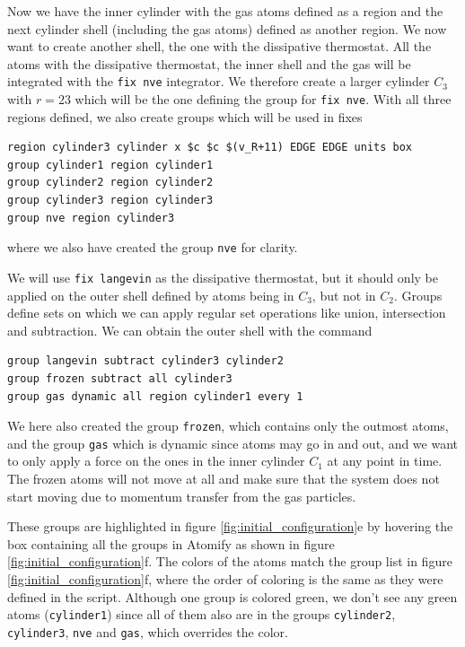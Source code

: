 \documentclass[12pt,a4paper,final]{iopart}
\newcommand{\code}[1]{\colorbox{light-gray}{\color{RawSienna}\texttt{#1}}}
\begin{document}
Now we have the inner cylinder with the gas atoms defined as a region and the next cylinder shell (including the gas atoms) defined as another region.
We now want to create another shell, the one with the dissipative thermostat.
All the atoms with the dissipative thermostat, the inner shell and the gas will be integrated with the \code{fix nve} integrator.
We therefore create a larger cylinder $C_3$ with $r=23$ which will be the one defining the group for \code{fix nve}.
With all three regions defined, we also create groups which will be used in fixes
\begin{lstlisting}
region cylinder3 cylinder x $c $c $(v_R+11) EDGE EDGE units box
group cylinder1 region cylinder1
group cylinder2 region cylinder2
group cylinder3 region cylinder3
group nve region cylinder3
\end{lstlisting}
where we also have created the group \code{nve} for clarity.

We will use \code{fix langevin}\cite{schneider1978molecular} as the dissipative thermostat,
but it should only be applied on the outer shell defined by atoms being in $C_3$, but not in $C_2$.
Groups define sets on which we can apply regular set operations like union, intersection and subtraction.
We can obtain the outer shell with the command

\begin{lstlisting}
group langevin subtract cylinder3 cylinder2
group frozen subtract all cylinder3
group gas dynamic all region cylinder1 every 1
\end{lstlisting}

We here also created the group \code{frozen}, which contains only the outmost atoms,
and the group \code{gas} which is dynamic since atoms may go in and out, and we want
to only apply a force on the ones in the inner cylinder $C_1$ at any point in time.
The frozen atoms will not move at all and make sure that the system does not start 
moving due to momentum transfer from the gas particles.

These groups are highlighted in figure \ref{fig:initial_configuration}e by hovering the
box containing all the groups in Atomify as shown in figure \ref{fig:initial_configuration}f.
The colors of the atoms match the group list in figure \ref{fig:initial_configuration}f,
where the order of coloring is the same as they were defined in the script.
Although one group is colored green, we don't see any green atoms (\code{cylinder1})
since all of them also are in the groups \code{cylinder2}, \code{cylinder3}, \code{nve} and \code{gas},
which overrides the color.
\end{document}
